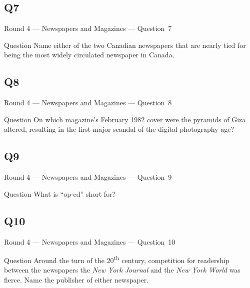 \documentclass[11pt]{beamer}
\begin{document}
\subsection*{Q7}
\begin{frame}[t]{Round 4 --- Newspapers and Magazines --- \mbox{Question 7}}
    \vspace{-0.5em}
    \begin{block}{Question}
        Name either of the two Canadian newspapers that are nearly tied for being the most widely circulated newspaper in Canada.
    \end{block}
\end{frame}
\subsection*{Q8}
\begin{frame}[t]{Round 4 --- Newspapers and Magazines --- \mbox{Question 8}}
    \vspace{-0.5em}
    \begin{block}{Question}
        On which magazine's February 1982 cover were the pyramids of Giza altered, resulting in the first major scandal of the digital photography age?
    \end{block}
\end{frame}
\subsection*{Q9}
\begin{frame}[t]{Round 4 --- Newspapers and Magazines --- \mbox{Question 9}}
    \vspace{-0.5em}
    \begin{block}{Question}
        What is ``op-ed'' short for?
    \end{block}
\end{frame}
\subsection*{Q10}
\begin{frame}[t]{Round 4 --- Newspapers and Magazines --- \mbox{Question 10}}
    \vspace{-0.5em}
    \begin{block}{Question}
        Around the turn of the 20\textsuperscript{th} century, competition for readership between the newspapers the \emph{New York Journal} and the \emph{New York World} was fierce. Name the publisher of either newspaper.
    \end{block}
\end{frame}
\end{document}
